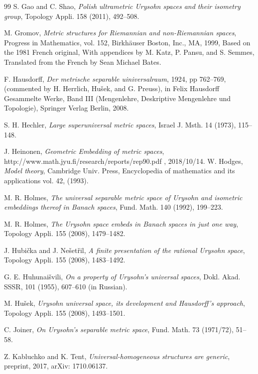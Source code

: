 \documentclass[leqno, 12pt]{jsarticle}
\begin{document}
\begin{thebibliography}{99}
S. Gao and C. Shao, 
\textit{Polish ultrametric Urysohn spaces and their isometry group}, 
Topology Appli. 158 (2011), 492--508. 


M. Gromov, 
\textit{Metric structures for Riemannian and non-Riemannian spaces}, 
Progress in Mathematics, vol. 152, 
Birkh\"{a}user Boston, Inc., 
MA, 1999, 
Based on the 1981 French original, 
With 
appendices by 
M. Katz, P. Pansu,
and 
S. Semmes, 
Translated 
from the 
French 
by 
Sean Michael Bates. 


F. Hausdorff, 
\textit{Der metrische separable uiniversalraum}, 
1924, pp 762--769,  (commented by H. Herrlich, Hu\v{s}ek,  and G. Preuss), 
  in Felix Hausdorff Gesammelte Werke, Band III (Mengenlehre, Deskriptive Mengenlehre und Topologie), Springer Verlag Berlin, 2008. 


S. H. Hechler, 
\textit{Large superuniversal metric spaces}, 
Israel J. Msth. 14 (1973), 115--148. 

J. Heinonen, \textit{Geometric Embedding of metric spaces}, http://www.math.jyu.fi/research/reports/rep90.pdf , 2018/10/14.
W. Hodges, 
\textit{Model theory}, 
Cambridge Univ. Press, 
Encyclopedia of mathematics and its applications vol. 42, 
(1993). 

M. R. Holmes, 
\textit{The universal separable metric space of Urysohn 
and isometric embeddings thereof in Banach spaces}, 
Fund. Math. 140 (1992), 199--223. 


M. R. Holmes, 
\textit{The Urysohn space embeds in Banach spaces in just one way}, 
Topology Appli. 
155 (2008), 1479--1482. 

J. Hubi\v{c}ka and J. Ne\v{s}et\v{r}il, 
\textit{A finite presentation of the rational Urysohn space}, 
Topology Appli. 155 (2008), 1483--1492. 


G. E. Huhunai\v{s}vili, 
\textit{On a property of Urysohn's  universal spaces}, 
Dokl. Akad. SSSR, 101 (1955), 607--610 (in Russian). 

M. Hu\v{s}ek, \textit{Urysohn universal space, its development and Hausdorff's approach}, 
Topology Appli. 155 (2008), 1493--1501. 


C. Joiner, 
\textit{On Urysohn's separable metric space}, 
Fund. Math. 73 (1971/72), 51--58. 

Z. Kabluchko and K. Tent, 
\textit{Universal-homogeneous structures are generic}, 
preprint, 2017, arXiv: 1710.06137. 



\end{thebibliography}
\end{document}
